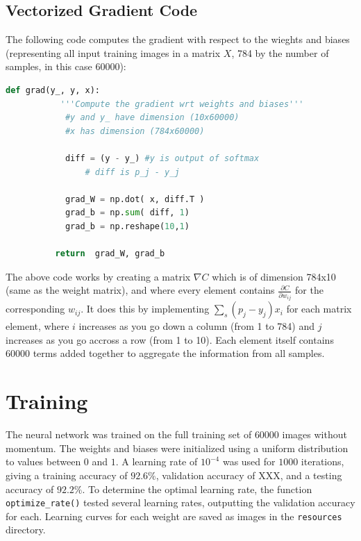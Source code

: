 \documentclass{article}
\begin{document}
   \subsection{Vectorized Gradient Code}
   The following code computes the gradient with respect to the wieghts and biases
   (representing all input training images in a matrix $X$, 784 by the number of samples, in this case 60000):
      \begin{lstlisting}[language=Python]
         def grad(y_, y, x):
      	   '''Compute the gradient wrt weights and biases'''
          	#y and y_ have dimension (10x60000)
          	#x has dimension (784x60000)

          	diff = (y - y_) #y is output of softmax
              	# diff is p_j - y_j

          	grad_W = np.dot( x, diff.T )
          	grad_b = np.sum( diff, 1)
          	grad_b = np.reshape(10,1)

          return  grad_W, grad_b
      \end{lstlisting}

   The above code works by creating a matrix $\nabla C $ which is of dimension 784x10
   (same as the weight matrix), and where every element contains $\frac{ \partial C}{ \partial w_{ij} }$ for the corresponding $w_{ij}$.
   It does this by implementing $\sum_s ( p_j - y_j ) x_i$ for each matrix element, where $i$ increases as you go down
   a column (from 1 to 784) and $j$ increases as you go accross a row (from 1 to 10). Each element itself contains 60000
   terms added together to aggregate the information from all samples.

   \section{Training}
   The neural network was trained on the full training set of $60000$ images without momentum.
   The weights and biases were initialized using a uniform distribution to values between $0$ and $1$.
   A learning rate of $10^{-4}$ was used for $1000$ iterations, giving a training accuracy of $92.6\%$,
   validation accuracy of XXX, and a testing accuracy of $92.2\%$.
   To determine the optimal learning rate, the function \texttt{optimize\_rate()} tested several
   learning rates, outputting the validation accuracy for each. Learning curves for each weight
   are saved as images in the \texttt{resources} directory.
\end{document}
